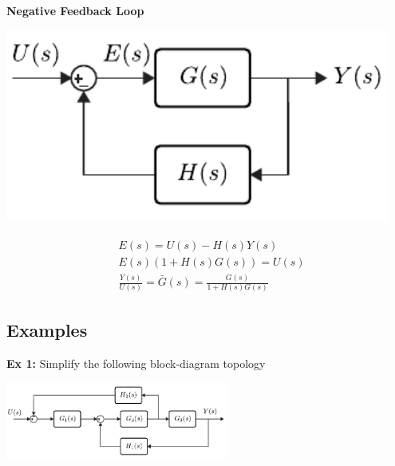 \documentclass[twoside]{article}
\begin{document}
\textbf{Negative Feedback Loop}

    \begin{minipage}[h]{0.6\linewidth}
    \begin{center}
      \includegraphics[width=0.95\textwidth]{feedback}
    \end{center}
  \end{minipage}
  \begin{minipage}[h]{0.4\linewidth}
    \begin{center}
      \begin{align*}
      &E(s) = U(s) - H(s) Y(s)
      \\
      &E(s) \left(1 + H(s) G(s) \right) = U(s) 
      \\
      &\frac{Y(s)}{U(s)} = \bar{G}(s) = \frac{G(s)}{1 + H(s) G(s)}
       \end{align*}
    \end{center}
  \end{minipage}
  
  \newpage
  
  \subsection{Examples} 
  
  \textbf{Ex 1:} Simplify the following block-diagram topology
  
      \begin{minipage}[t]{0.95\linewidth}
    \begin{center}
      \includegraphics[width=0.55\textwidth]{ex1}
    \end{center}
  \end{minipage}
  
\end{document}
